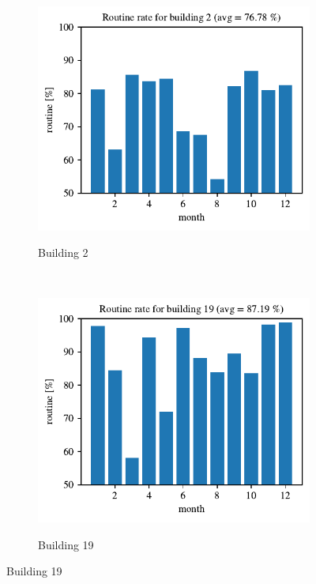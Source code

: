 \begin{figure}[H]
	\begin{subfigure}{.5\textwidth}
		\caption{Building 2}
		\includegraphics[width=1\linewidth]{../Figures/EC/b2year.pdf}
		\label{fig:ec_b2year}
	\end{subfigure}%
	~ 
	\begin{subfigure}{.5\textwidth}
		\caption{Building 19}
		\includegraphics[width=1\linewidth]{../Figures/EC/b19year.pdf}
		\label{fig:ec_b19year}
	\end{subfigure}%
    \bigskip


\end{figure}
